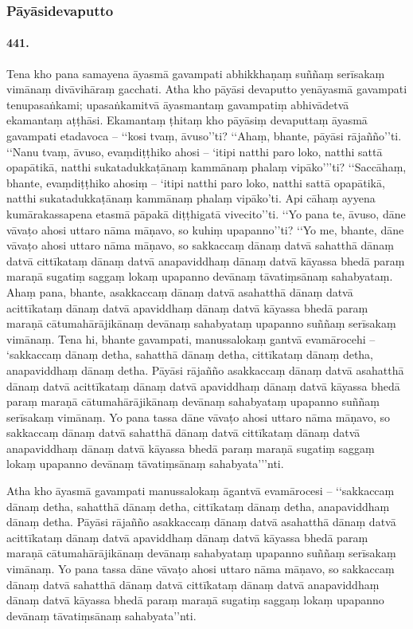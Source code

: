 \subsubsection{Pāyāsidevaputto}

\paragraph{441.} Tena kho pana samayena āyasmā gavampati abhikkhaṇaṃ suññaṃ serīsakaṃ vimānaṃ divāvihāraṃ gacchati. Atha kho pāyāsi devaputto yenāyasmā gavampati tenupasaṅkami; upasaṅkamitvā āyasmantaṃ gavampatiṃ abhivādetvā ekamantaṃ aṭṭhāsi. Ekamantaṃ ṭhitaṃ kho pāyāsiṃ devaputtaṃ āyasmā gavampati etadavoca – ‘‘kosi tvaṃ, āvuso’’ti? ‘‘Ahaṃ, bhante, pāyāsi rājañño’’ti. ‘‘Nanu tvaṃ, āvuso, evaṃdiṭṭhiko ahosi – ‘itipi natthi paro loko, natthi sattā opapātikā, natthi sukatadukkaṭānaṃ kammānaṃ phalaṃ vipāko’’’ti? ‘‘Saccāhaṃ, bhante, evaṃdiṭṭhiko ahosiṃ – ‘itipi natthi paro loko, natthi sattā opapātikā, natthi sukatadukkaṭānaṃ kammānaṃ phalaṃ vipāko’ti. Api cāhaṃ ayyena kumārakassapena etasmā pāpakā diṭṭhigatā vivecito’’ti. ‘‘Yo pana te, āvuso, dāne vāvaṭo ahosi uttaro nāma māṇavo, so kuhiṃ upapanno’’ti? ‘‘Yo me, bhante, dāne vāvaṭo ahosi uttaro nāma māṇavo, so sakkaccaṃ dānaṃ datvā sahatthā dānaṃ datvā cittīkataṃ dānaṃ datvā anapaviddhaṃ dānaṃ datvā kāyassa bhedā paraṃ maraṇā sugatiṃ saggaṃ lokaṃ upapanno devānaṃ tāvatiṃsānaṃ sahabyataṃ. Ahaṃ pana, bhante, asakkaccaṃ dānaṃ datvā asahatthā dānaṃ datvā acittīkataṃ dānaṃ datvā apaviddhaṃ dānaṃ datvā kāyassa bhedā paraṃ maraṇā cātumahārājikānaṃ devānaṃ sahabyataṃ upapanno suññaṃ serīsakaṃ vimānaṃ. Tena hi, bhante gavampati, manussalokaṃ gantvā evamārocehi – ‘sakkaccaṃ dānaṃ detha, sahatthā dānaṃ detha, cittīkataṃ dānaṃ detha, anapaviddhaṃ dānaṃ detha. Pāyāsi rājañño asakkaccaṃ dānaṃ datvā asahatthā dānaṃ datvā acittīkataṃ dānaṃ datvā apaviddhaṃ dānaṃ datvā kāyassa bhedā paraṃ maraṇā cātumahārājikānaṃ devānaṃ sahabyataṃ upapanno suññaṃ serīsakaṃ vimānaṃ. Yo pana tassa dāne vāvaṭo ahosi uttaro nāma māṇavo, so sakkaccaṃ dānaṃ datvā sahatthā dānaṃ datvā cittīkataṃ dānaṃ datvā anapaviddhaṃ dānaṃ datvā kāyassa bhedā paraṃ maraṇā sugatiṃ saggaṃ lokaṃ upapanno devānaṃ tāvatiṃsānaṃ sahabyata’’’nti.

Atha kho āyasmā gavampati manussalokaṃ āgantvā evamārocesi – ‘‘sakkaccaṃ dānaṃ detha, sahatthā dānaṃ detha, cittīkataṃ dānaṃ detha, anapaviddhaṃ dānaṃ detha. Pāyāsi rājañño asakkaccaṃ dānaṃ datvā asahatthā dānaṃ datvā acittīkataṃ dānaṃ datvā apaviddhaṃ dānaṃ datvā kāyassa bhedā paraṃ maraṇā cātumahārājikānaṃ devānaṃ sahabyataṃ upapanno suññaṃ serīsakaṃ vimānaṃ. Yo pana tassa dāne vāvaṭo ahosi uttaro nāma māṇavo, so sakkaccaṃ dānaṃ datvā sahatthā dānaṃ datvā cittīkataṃ dānaṃ datvā anapaviddhaṃ dānaṃ datvā kāyassa bhedā paraṃ maraṇā sugatiṃ saggaṃ lokaṃ upapanno devānaṃ tāvatiṃsānaṃ sahabyata’’nti.


